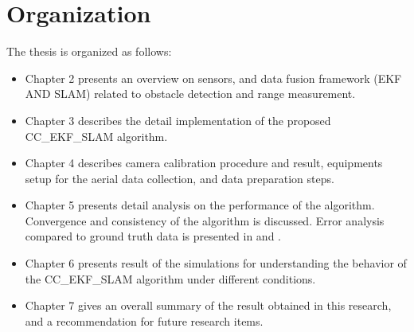 \section{Organization}\label{section:Organization}
The thesis is organized as follows:

\begin{itemize}
  \item Chapter 2 presents an overview on sensors, and data fusion
  framework (EKF AND SLAM) related to obstacle detection and range measurement.
  \item Chapter 3 describes the detail implementation of the proposed
  CC\_EKF\_SLAM algorithm.
  \item Chapter 4 describes camera calibration procedure and result, equipments
  setup for the aerial data collection, and data preparation steps.
  \item Chapter 5 presents detail analysis on the performance of the
  algorithm. Convergence and consistency of the algorithm is
  discussed. Error analysis compared to ground truth data is presented
  in and . 
  \item Chapter 6 presents result of the simulations for understanding
  the behavior of the CC\_EKF\_SLAM algorithm under different
  conditions.  
  \item Chapter 7 gives an overall summary of the result obtained in
  this research, and a recommendation for future research items. 
\end{itemize}

